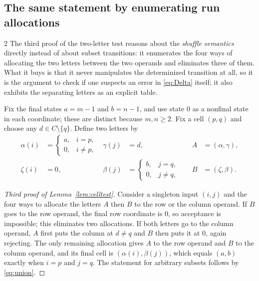 \documentclass[11pt,letterpaper]{article}
\numberwithin{equation}{section}
\theoremstyle{definition}
\theoremstyle{remark}
\begin{document}
\subsection{The same statement by enumerating run allocations}
\begin{variantbox}{2}
The third proof of the two-letter test reasons about the \emph{shuffle
semantics} directly instead of about subset transitions: it enumerates the
four ways of allocating the two letters between the two operands and
eliminates three of them. What it buys is that it never manipulates the
determinized transition at all, so it is the argument to check if one
suspects an error in \eqref{eq:Delta} itself; it also exhibits the separating
letters as an explicit table.
\end{variantbox}

Fix the final states $a=m-1$ and $b=n-1$, and use state $0$ as a nonfinal
state in each coordinate; these are distinct because $m,n\ge2$. Fix a cell
$(p,q)$ and choose any $d\in C\setminus\{q\}$. Define two letters by
\[
\begin{aligned}
 \alpha(i)&=\begin{cases}a,&i=p,\\0,&i\ne p,\end{cases}
 &\gamma(j)&=d, &\quad A&=(\alpha,\gamma),\\
 \zeta(i)&=0,
 &\beta(j)&=\begin{cases}b,&j=q,\\0,&j\ne q,\end{cases}
 &\quad B&=(\zeta,\beta).
\end{aligned}
\]

\begin{proof}[Third proof of Lemma~\ref{lem:celltest}]
Consider a singleton input $(i,j)$ and the four ways to allocate the letters
$A$ then $B$ to the row or the column operand. If $B$ goes to the row operand,
the final row coordinate is $0$, so acceptance is impossible; this eliminates
two allocations. If both letters go to the column operand, $A$ first puts the
column at $d\ne q$ and $B$ then puts it at $0$, again rejecting. The only
remaining allocation gives $A$ to the row operand and $B$ to the column
operand, and its final cell is $(\alpha(i),\beta(j))$, which equals $(a,b)$
exactly when $i=p$ and $j=q$. The statement for arbitrary subsets follows by
\eqref{eq:union}.
\end{proof}
\end{document}
